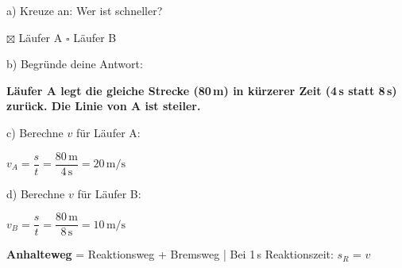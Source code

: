 \documentclass[11pt,a4paper]{article}
\newcommand{\lsg}[1]{\textcolor{loesung}{\textbf{#1}}}
\begin{document}
\vspace{0.5em}
\begin{minipage}{0.5\textwidth}
\end{minipage}
\hfill
\begin{minipage}{0.47\textwidth}
a) Kreuze an: Wer ist schneller?

\vspace{0.3em}
\quad \lsg{$\boxtimes$} Läufer A \quad $\square$ Läufer B

\vspace{0.8em}
b) Begründe deine Antwort:

\vspace{0.2em}
\lsg{Läufer A legt die gleiche Strecke (80\,m) in kürzerer Zeit (4\,s statt 8\,s) zurück. Die Linie von A ist steiler.}

\vspace{0.8em}
c) Berechne $v$ für Läufer A:

\vspace{0.2em}
\lsg{$v_A = \dfrac{s}{t} = \dfrac{80\,\text{m}}{4\,\text{s}} = 20\,\si{\metre\per\second}$}

\vspace{0.8em}
d) Berechne $v$ für Läufer B:

\vspace{0.2em}
\lsg{$v_B = \dfrac{s}{t} = \dfrac{80\,\text{m}}{8\,\text{s}} = 10\,\si{\metre\per\second}$}
\end{minipage}

\vspace{1em}

\begin{merkkasten}[title=Verkehrssicherheit]
\textbf{Anhalteweg} = Reaktionsweg + Bremsweg \quad | \quad Bei 1\,s Reaktionszeit: $s_R$ = $v$
\end{merkkasten}
\end{document}
